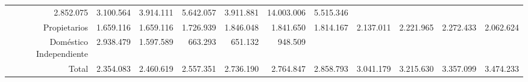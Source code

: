 \begin{tabular}{lllllllllll}
  \multicolumn{1}{r}{2.852.075} &
  \multicolumn{1}{r}{3.100.564} &
  \multicolumn{1}{r}{3.914.111} &
  \multicolumn{1}{r}{5.642.057} &
  \multicolumn{1}{r}{3.911.881} &
  \multicolumn{1}{r}{14.003.006} &
  \multicolumn{1}{r}{5.515.346} \\
\multicolumn{1}{r}{Propietarios\hspace{1em}} &
  \multicolumn{1}{|r}{1.659.116} &
  \multicolumn{1}{r}{1.659.116} &
  \multicolumn{1}{r}{1.726.939} &
  \multicolumn{1}{r}{1.846.048} &
  \multicolumn{1}{r}{1.841.650} &
  \multicolumn{1}{r}{1.814.167} &
  \multicolumn{1}{r}{2.137.011} &
  \multicolumn{1}{r}{2.221.965} &
  \multicolumn{1}{r}{2.272.433} &
  \multicolumn{1}{r}{2.062.624} \\
\multicolumn{1}{r}{Doméstico Independiente\hspace{1em}} &
  \multicolumn{1}{|r}{2.938.479} &
  \multicolumn{1}{r}{1.597.589} &
  \multicolumn{1}{r}{663.293} &
  \multicolumn{1}{r}{651.132} &
  \multicolumn{1}{r}{948.509} &
  \multicolumn{1}{r}{} &
  \multicolumn{1}{r}{} &
  \multicolumn{1}{r}{} &
  \multicolumn{1}{r}{} &
  \multicolumn{1}{r}{} \\
\multicolumn{1}{r}{Total\hspace{1em}} &
  \multicolumn{1}{|r}{2.354.083} &
  \multicolumn{1}{r}{2.460.619} &
  \multicolumn{1}{r}{2.557.351} &
  \multicolumn{1}{r}{2.736.190} &
  \multicolumn{1}{r}{2.764.847} &
  \multicolumn{1}{r}{2.858.793} &
  \multicolumn{1}{r}{3.041.179} &
  \multicolumn{1}{r}{3.215.630} &
  \multicolumn{1}{r}{3.357.099} &
  \multicolumn{1}{r}{3.474.233} \\
\cline{1-11}
\end{tabular}
